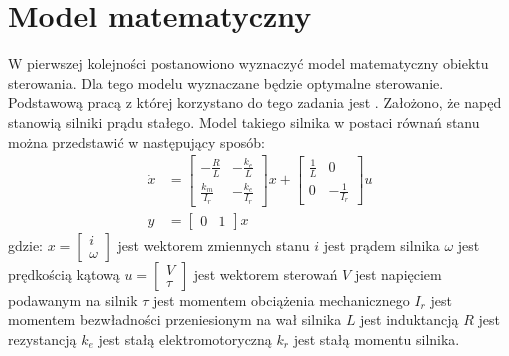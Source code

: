 \section{Model matematyczny}
\label{sec:model}

W pierwszej kolejności postanowiono wyznaczyć model matematyczny obiektu sterowania. Dla tego modelu wyznaczane będzie optymalne sterowanie. Podstawową pracą z której korzystano do tego zadania jest \cite{Babazadeh}. Założono, że napęd stanowią silniki prądu stałego. Model takiego silnika w postaci równań stanu można przedstawić w następujący sposób:
\begin{equation}
\begin{aligned}
\dot{x}&=
\begin{bmatrix}
	-\frac{R}{L} & -\frac{k_e}{L} \\
	\frac{k_m}{I_r} & -\frac{k_e}{I_r}
\end{bmatrix}
x+
\begin{bmatrix}
	\frac{1}{L} & 0 \\
	0 & -\frac{1}{I_r}
\end{bmatrix}
u\\
y&=
\begin{bmatrix}
	0 & 1
\end{bmatrix}
x
\end{aligned}
\label{eq:dc_model}
\end{equation}
\noindent gdzie:\newline
\(x=
\begin{bmatrix}
	i \\
	\omega
\end{bmatrix}\) jest wektorem zmiennych stanu\newline
\(i\) jest prądem silnika\newline
\(\omega\) jest prędkością kątową\newline
\(u=
\begin{bmatrix}
	V \\
	\tau
\end{bmatrix}\) jest wektorem sterowań\newline
\(V\) jest napięciem podawanym na silnik\newline
\(\tau\) jest momentem obciążenia mechanicznego\newline
\(I_r\) jest momentem bezwładności przeniesionym na wał silnika\newline
\(L\) jest induktancją\newline
\(R\) jest rezystancją\newline
\(k_e\) jest stałą elektromotoryczną\newline
\(k_r\) jest stałą momentu silnika.

